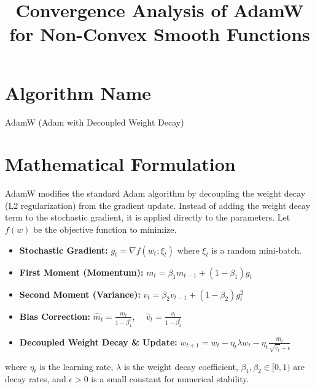 \documentclass[11pt]{article}
\title{\textbf{Convergence Analysis of AdamW for Non-Convex Smooth Functions}}
\date{}
\begin{document}
\maketitle

\section*{Algorithm Name}
AdamW (Adam with Decoupled Weight Decay)

\section*{Mathematical Formulation}
AdamW modifies the standard Adam algorithm by decoupling the weight decay (L2 regularization) from the gradient update. Instead of adding the weight decay term to the stochastic gradient, it is applied directly to the parameters. Let $f(w)$ be the objective function to minimize.
\begin{itemize}
    \item \textbf{Stochastic Gradient:} $g_t = \nabla f(w_t; \xi_t)$ where $\xi_t$ is a random mini-batch.
    \item \textbf{First Moment (Momentum):} $m_t = \beta_1 m_{t-1} + (1-\beta_1) g_t$
    \item \textbf{Second Moment (Variance):} $v_t = \beta_2 v_{t-1} + (1-\beta_2) g_t^2$
    \item \textbf{Bias Correction:} $\hat{m}_t = \frac{m_t}{1-\beta_1^t}$, $\quad \hat{v}_t = \frac{v_t}{1-\beta_2^t}$
    \item \textbf{Decoupled Weight Decay \& Update:} $w_{t+1} = w_t - \eta_t \lambda w_t - \eta_t \frac{\hat{m}_t}{\sqrt{\hat{v}_t} + \epsilon}$
\end{itemize}
where $\eta_t$ is the learning rate, $\lambda$ is the weight decay coefficient, $\beta_1, \beta_2 \in [0, 1)$ are decay rates, and $\epsilon > 0$ is a small constant for numerical stability.
\end{document}
